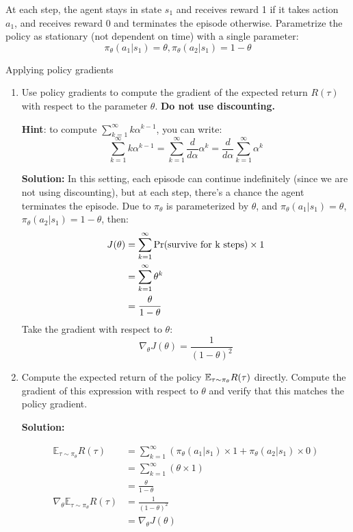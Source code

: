\documentclass{article}
\begin{document}
At each step, the agent stays in state $s_1$ and receives reward 1 if it takes action $a_1$, and receives reward 0 and terminates the episode otherwise.
Parametrize the policy as stationary (not dependent on time) with a single parameter:
\[\pi_\theta(a_1|s_1) = \theta, \pi_\theta(a_2|s_1) = 1-\theta\]

\begin{enumerate}
 Applying policy gradients
\begin{enumerate}
    \item Use policy gradients to compute the gradient of the expected return $R(\tau)$ with respect to the parameter $\theta$. \textbf{Do not use discounting.}

    \textbf{Hint}: to compute $\sum_{k=1}^\infty k\alpha^{k-1}$, you can write:
    \[\sum_{k=1}^\infty k\alpha^{k-1} = \sum_{k=1}^\infty \frac{d}{d\alpha}\alpha^k = \frac{d}{d\alpha}\sum_{k=1}^\infty\alpha^k\]

\textbf{Solution:}
	In this setting, each episode can continue indefinitely (since we are not using discounting), but at each step, there’s a chance the agent terminates the episode.
	Due to $\pi_{\theta}$ is parameterized by $\theta$, and $\pi_{\theta}(a_1 | s_1) = \theta$, $\pi_{\theta}(a_2 | s_1) = 1- \theta$, then:
		$$\begin{aligned}
			J(\theta) &= \sum_{k=1}^{\infty} \rm Pr(\text{survive for k steps}) \times 1 \\
			&= \sum_{k=1}^{\infty} \theta^k \\
			&= \frac{\theta}{1 - \theta} \\
		\end{aligned}$$
	Take the gradient with respect to $\theta$: 
		$$
			\nabla_\theta  J(\theta) = \frac{1}{(1 - \theta) ^ 2}
		$$
		
    \item \label{exact_gradient} Compute the expected return of the policy $\mathbb{E}_{\tau \sim \pi_\theta} R(\tau)$ directly. Compute the gradient of this expression with respect to $\theta$ and verify that this matches the policy gradient.

\textbf{Solution:}

		$$\begin{aligned}	
			\mathbb{E}_{\tau \sim \pi_\theta} R(\tau) &= \sum_{k=1}^{\infty} \left(\pi_{\theta}(a_1 | s_1) \times 1 + \pi_{\theta}(a_2 | s_1) \times 0  \right) \\
			&= \sum_{k=1}^{\infty} \left(\theta \times 1\right) \\
			&= \frac{\theta}{1 - \theta}  \\
			\nabla_\theta \mathbb{E}_{\tau \sim \pi_\theta} R(\tau) &=  \frac{1}{(1 - \theta) ^ 2} \\
			&= \nabla_\theta  J(\theta) \\
		\end{aligned}$$
			


\end{enumerate}
\end{enumerate}
\end{document}
